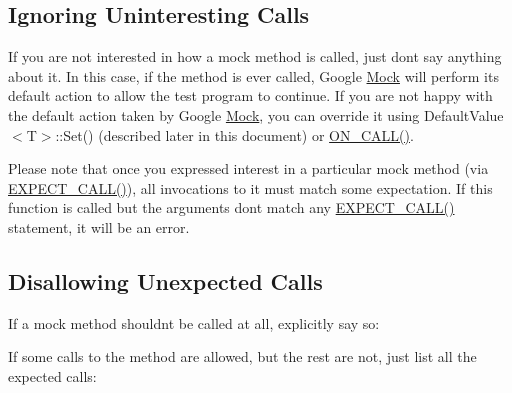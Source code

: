 \subsection*{Ignoring Uninteresting Calls}

If you are not interested in how a mock method is called, just don\textquotesingle{}t say anything about it. In this case, if the method is ever called, Google \mbox{\hyperlink{class_mock}{Mock}} will perform its default action to allow the test program to continue. If you are not happy with the default action taken by Google \mbox{\hyperlink{class_mock}{Mock}}, you can override it using {\ttfamily Default\+Value$<$T$>$\+::\+Set()} (described later in this document) or {\ttfamily \mbox{\hyperlink{googletest-master_2googlemock_2include_2gmock_2gmock-spec-builders_8h_a5b12ae6cf84f0a544ca811b380c37334}{O\+N\+\_\+\+C\+A\+L\+L()}}}.

Please note that once you expressed interest in a particular mock method (via {\ttfamily \mbox{\hyperlink{googletest-master_2googlemock_2include_2gmock_2gmock-spec-builders_8h_a535a6156de72c1a2e25a127e38ee5232}{E\+X\+P\+E\+C\+T\+\_\+\+C\+A\+L\+L()}}}), all invocations to it must match some expectation. If this function is called but the arguments don\textquotesingle{}t match any {\ttfamily \mbox{\hyperlink{googletest-master_2googlemock_2include_2gmock_2gmock-spec-builders_8h_a535a6156de72c1a2e25a127e38ee5232}{E\+X\+P\+E\+C\+T\+\_\+\+C\+A\+L\+L()}}} statement, it will be an error.

\subsection*{Disallowing Unexpected Calls}

If a mock method shouldn\textquotesingle{}t be called at all, explicitly say so\+:


\begin{DoxyCode}{0}
\end{DoxyCode}


If some calls to the method are allowed, but the rest are not, just list all the expected calls\+:


\begin{DoxyCode}{0}
\end{DoxyCode}


